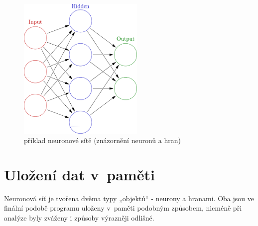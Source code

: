 \documentclass[12pt, a4paper, titlepage]{report}
\begin{document}
\begin{figure}[htbp]
    \centering
    \includegraphics[width=6cm]{img/nnet.png}
    \caption{příklad neuronové sítě (znázornění neuronů a hran)}
    \label{fig:nnet}
\end{figure}
\section{Uložení dat v~paměti}
Neuronová síť je tvořena dvěma typy „objektů“ - neurony a hranami. Oba jsou ve finální podobě programu uloženy v~paměti podobným způsobem, nicméně při analýze byly zváženy i způsoby výrazněji odlišné.
\end{document}

